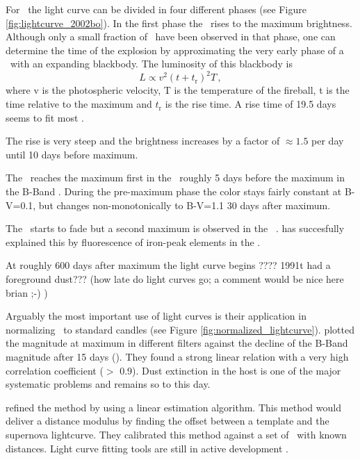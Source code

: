 For \sneia\ the light curve can be divided in four different phases (see Figure \ref{fig:lightcurve_2002bo}). In the first phase the \sneia\  rises to the maximum brightness. Although only a small fraction of \sneia\ have been observed in that phase, one can determine the time of the explosion by approximating the very early phase of a \sneia\ with an expanding blackbody. The luminosity of this blackbody is 
\[L\propto v^2 (t+t_\textrm{r})^2 T\,,\]
where v is the photospheric velocity, T is the temperature of the fireball, t is the time relative to the maximum and $t_\textrm{r}$ is the rise time. A rise time of 19.5 days \citep{1999AJ....118.2675R} seems to fit most \sneia. 

The rise is very steep and the brightness increases by a factor of $\approx 1.5$ per day until 10 days before maximum. 

The \snia\ reaches the maximum first in the \nir\ roughly 5 days before the maximum in the B-Band \citep{2000MNRAS.314..782M}. 
During the pre-maximum phase the color stays fairly constant at B-V=0.1, but changes non-monotonically to B-V=1.1 30 days after maximum. 

The \snia\ starts to fade but  a second maximum is observed in the \nir\ \citep{2008ApJ...689..377W}.  \citet{2006ApJ...649..939K} has succesfully explained this by fluorescence of iron-peak elements in the \nir. 

At roughly 600 days after maximum the light curve begins ???? 1991t had a foreground dust??? (how late do light curves go; a comment would be nice here brian ;-) ) 

Arguably the most important use of light curves is their application in normalizing \sneia\ to standard candles (see Figure \ref{fig:normalized_lightcurve}). \citet[][]{1993ApJ...413L.105P} plotted the magnitude at maximum in different filters against the decline of the B-Band magnitude after 15 days (\dmb).  They found a strong linear relation with a very high correlation coefficient ($>$ 0.9). Dust extinction in the host is one of the major systematic problems and remains so to this day. 

\cite{1995ApJ...438L..17R} refined the method by using a linear estimation algorithm. This method would deliver a distance modulus by finding the offset between a template and the supernova lightcurve. They calibrated this method against a set of \sneia\ with known distances. 
Light curve fitting tools are still in active development \cite[e.g.][]{2007ApJ...659..122J, 2007A&A...466...11G}.

